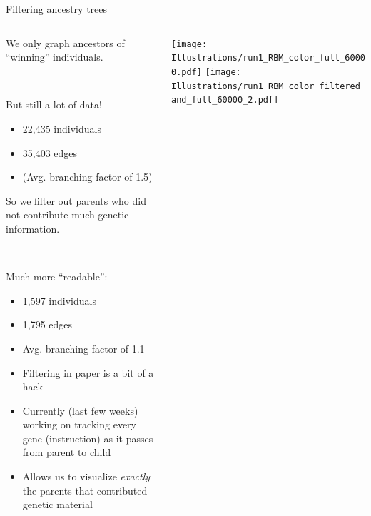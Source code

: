 \documentclass{beamer}
\begin{document}
\begin{frame}{Filtering ancestry trees}
\begin{columns}
\begin{column}{.6\textwidth}
\begin{overprint}
We only graph ancestors of ``winning'' individuals.

~

But still a lot of data!
\begin{itemize}
\item 22,435 individuals
\item 35,403 edges
\item (Avg. branching factor of 1.5)
\end{itemize}


So we filter out parents who did not contribute much genetic information.

~

Much more ``readable'':
\begin{itemize}
	\item 1,597 individuals
    \item 1,795 edges
    \item Avg. branching factor of 1.1
\end{itemize}

\begin{itemize}
\item Filtering in paper is a bit of a hack
\item Currently (last few weeks) working on tracking every gene (instruction) as it passes from parent to child
\item Allows us to visualize \emph{exactly} the parents that contributed genetic material
\end{itemize}
\end{overprint}

\end{column}
\begin{column}{.4\textwidth}
\begin{overprint}
\texttt{[image: Illustrations/run1\_RBM\_color\_full\_60000.pdf]} 
\texttt{[image: Illustrations/run1\_RBM\_color\_filtered\_and\_full\_60000\_2.pdf]} 
\end{overprint}
\end{column}
\end{columns}
\end{frame}
\end{document}
